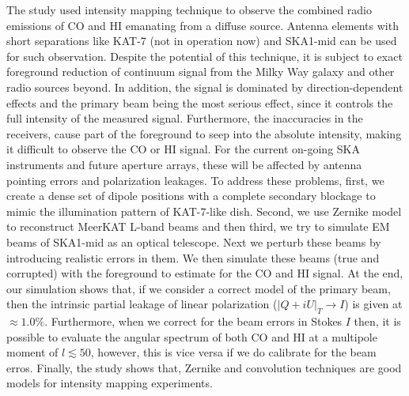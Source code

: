 The study used intensity mapping technique to observe the combined radio emissions of CO and HI emanating from a diffuse source. Antenna elements with short separations like
KAT-7 (not in operation now) and SKA1-mid can be used for such observation. Despite the potential of this technique, it is subject to exact foreground reduction of continuum signal
from the Milky Way galaxy and other radio sources beyond. In addition, the signal is dominated by direction-dependent effects and the primary beam being the most serious effect,
since it controls the full intensity of the measured signal. Furthermore, the inaccuracies in the receivers, cause part of the foreground to seep into the absolute intensity, making
it difficult to observe the CO or HI signal. For the current on-going SKA instruments and future aperture arrays, these will be affected by antenna pointing errors and polarization
leakages. To address these problems, first, we create a dense set of dipole positions with a complete secondary blockage to mimic the illumination pattern of KAT-7-like dish. Second,
we use Zernike model to reconstruct MeerKAT L-band beams and then third, we try to simulate EM beams of SKA1-mid as an optical telescope. Next we perturb these beams by introducing
realistic errors in them. We then simulate these beams (true and corrupted) with the foreground to estimate for the CO and HI signal. At the end, our simulation shows that,
if we consider a correct model of the primary beam, then the intrinsic partial leakage of linear polarization ($|Q + iU|_{T} \longrightarrow I$) is given at $\approx 1.0 \%$. 
Furthermore, when we correct for the beam errors in Stokes $I$ then, it is possible to evaluate the angular spectrum of both CO and HI  at a multipole moment of $l \lesssim 50$, 
however, this is vice versa if we do calibrate for the beam erros. Finally, the study shows that, Zernike and convolution techniques are good models for intensity mapping experiments. 

